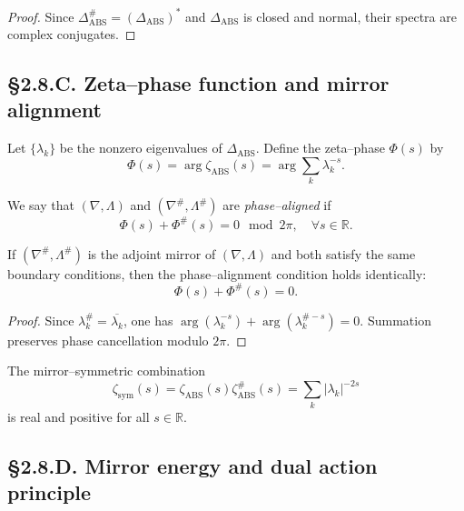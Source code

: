 \begin{proof}
Since $\Delta_{\mathrm{ABS}}^\# = (\Delta_{\mathrm{ABS}})^\ast$ and $\Delta_{\mathrm{ABS}}$ is closed and normal, their spectra are complex conjugates.
\end{proof}

\subsection*{§2.8.C. Zeta–phase function and mirror alignment}

\begin{definition}
Let $\{\lambda_k\}$ be the nonzero eigenvalues of $\Delta_{\mathrm{ABS}}$.  
Define the zeta–phase $\Phi(s)$ by
\[
\Phi(s) = \arg \zeta_{\mathrm{ABS}}(s)
= \arg \sum_k \lambda_k^{-s}.
\]
\]
\end{definition}

\begin{definition}
We say that $(\nabla,\Lambda)$ and $(\nabla^\#,\Lambda^\#)$ are \emph{phase–aligned} if
\[
\Phi(s) + \Phi^\#(s) = 0 \mod 2\pi, \quad \forall s\in\mathbb{R}.
\]
\]
\end{definition}

\begin{theorem}\label{thm:2.8.align}
If $(\nabla^\#,\Lambda^\#)$ is the adjoint mirror of $(\nabla,\Lambda)$ and both satisfy the same boundary conditions,  
then the phase–alignment condition holds identically:
\[
\Phi(s) + \Phi^\#(s) = 0.
\]
\]
\end{theorem}

\begin{proof}
Since $\lambda_k^\#=\overline{\lambda_k}$, one has $\arg(\lambda_k^{-s})+\arg(\lambda_k^{\#-s})=0$.
Summation preserves phase cancellation modulo $2\pi$.
\end{proof}

\begin{corollary}
The mirror–symmetric combination
\[
\zeta_{\mathrm{sym}}(s)
=\zeta_{\mathrm{ABS}}(s)\zeta_{\mathrm{ABS}}^\#(s)
=\sum_k |\lambda_k|^{-2s}
\]
is real and positive for all $s\in\mathbb{R}$.
\end{corollary}

\subsection*{§2.8.D. Mirror energy and dual action principle}

